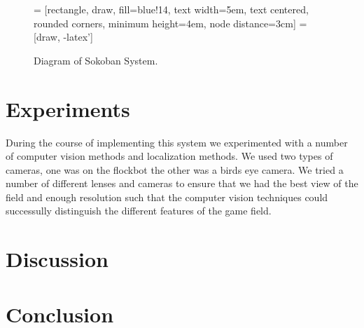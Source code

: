 \documentclass[twocolumn]{article}
\begin{document}
\begin{figure}[h]
 = [rectangle, draw, fill=blue!14, 
    text width=5em, text centered, rounded corners, minimum height=4em, node distance=3cm]
 = [draw, -latex']
    
\caption{Diagram of Sokoban System.}
\end{figure}

\section*{Experiments}

During the course of implementing this system we experimented with a number of computer vision methods and localization methods. We used two types of cameras, one was on the flockbot the other was a birds eye camera. We tried a number of different lenses and cameras to ensure that we had the best view of the field and enough resolution such that the computer vision techniques could successully distinguish the different features of the game field.



\section*{Discussion}

\section*{Conclusion}


{}
\end{document}
